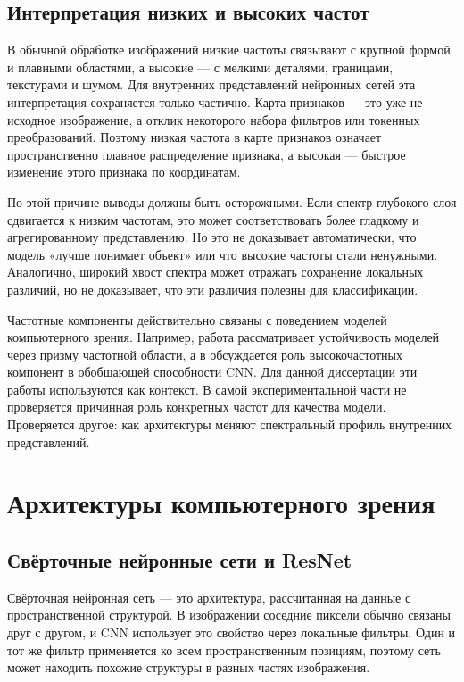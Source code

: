 \subsection{Интерпретация низких и высоких частот}

В обычной обработке изображений низкие частоты связывают с крупной формой и плавными областями, а высокие — с мелкими деталями, границами, текстурами и шумом. Для внутренних представлений нейронных сетей эта интерпретация сохраняется только частично. Карта признаков — это уже не исходное изображение, а отклик некоторого набора фильтров или токенных преобразований. Поэтому низкая частота в карте признаков означает пространственно плавное распределение признака, а высокая — быстрое изменение этого признака по координатам.

По этой причине выводы должны быть осторожными. Если спектр глубокого слоя сдвигается к низким частотам, это может соответствовать более гладкому и агрегированному представлению. Но это не доказывает автоматически, что модель «лучше понимает объект» или что высокие частоты стали ненужными. Аналогично, широкий хвост спектра может отражать сохранение локальных различий, но не доказывает, что эти различия полезны для классификации.

Частотные компоненты действительно связаны с поведением моделей компьютерного зрения. Например, работа \cite{yin2019fourier} рассматривает устойчивость моделей через призму частотной области, а в \cite{wang2020highfrequency} обсуждается роль высокочастотных компонент в обобщающей способности CNN. Для данной диссертации эти работы используются как контекст. В самой экспериментальной части не проверяется причинная роль конкретных частот для качества модели. Проверяется другое: как архитектуры меняют спектральный профиль внутренних представлений.

\section{Архитектуры компьютерного зрения}

\subsection{Свёрточные нейронные сети и ResNet}

Свёрточная нейронная сеть — это архитектура, рассчитанная на данные с пространственной структурой. В изображении соседние пиксели обычно связаны друг с другом, и CNN использует это свойство через локальные фильтры. Один и тот же фильтр применяется ко всем пространственным позициям, поэтому сеть может находить похожие структуры в разных частях изображения.

